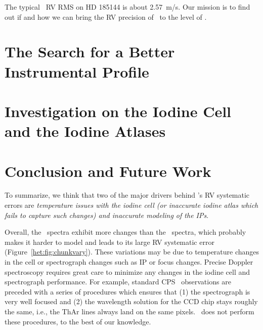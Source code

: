 The typical \keck\ RV RMS on HD 185144 is about 2.57~m/s. Our mission
is to find out if and how we can bring the RV precision of \het\ to
the level of \keck.


\section{The Search for a Better Instrumental Profile}\label{het:sec:ip}




\section{Investigation on the Iodine Cell and the Iodine Atlases}\label{het:sec:fts}




 

 
\section{Conclusion and Future Work}\label{het:sec:conclusion}
 
To summarize, we think that two of the major drivers behind \het's RV
systematic errors are {\em temperature issues with the iodine
cell (or inaccurate iodine atlas which fails to capture such changes)
and inaccurate modeling of the IPs}. 

Overall, the \het\ spectra exhibit more changes than the \keck\
spectra, which probably makes it harder to model and leads to its
large RV systematic error (Figure~\ref{het:fig:chunkvary}). These
variations may be due to temperature changes in the cell or
spectrograph changes such as IP or focus changes. Precise Doppler
spectroscopy requires great care to minimize any changes in the iodine
cell and spectrograph performance. For example, standard CPS \keck\
observations are preceded with a series of procedures which ensures
that (1) the spectrograph is very well focused and (2) the wavelength
solution for the CCD chip stays roughly the same, i.e., the ThAr lines
always land on the same pixels. \het\ does not perform these
procedures, to the best of our knowledge.

